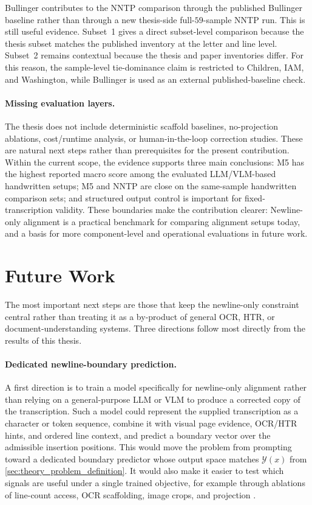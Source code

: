 Bullinger contributes to the NNTP comparison through the published Bullinger baseline rather than through a new thesis-side full-\(59\)-sample NNTP run. This is still useful evidence. Subset~1 gives a direct subset-level comparison because the thesis subset matches the published inventory at the letter and line level. Subset~2 remains contextual because the thesis and paper inventories differ. For this reason, the sample-level tie-dominance claim is restricted to Children, IAM, and Washington, while Bullinger is used as an external published-baseline check.

\paragraph{Missing evaluation layers.}
The thesis does not include deterministic scaffold baselines, no-projection ablations, cost/runtime analysis, or human-in-the-loop correction studies. These are natural next steps rather than prerequisites for the present contribution. Within the current scope, the evidence supports three main conclusions: M5 has the highest reported macro score among the evaluated LLM/VLM-based handwritten setups; M5 and NNTP are close on the same-sample handwritten comparison sets; and structured output control is important for fixed-transcription validity. These boundaries make the contribution clearer: Newline-only alignment is a practical benchmark for comparing alignment setups today, and a basis for more component-level and operational evaluations in future work.

\section{Future Work}
\label{sec:conclusion_future_work}

The most important next steps are those that keep the newline-only constraint central rather than treating it as a by-product of general OCR, HTR, or document-understanding systems. Three directions follow most directly from the results of this thesis.

\paragraph{Dedicated newline-boundary prediction.}
A first direction is to train a model specifically for newline-only alignment rather than relying on a general-purpose LLM or VLM to produce a corrected copy of the transcription. Such a model could represent the supplied transcription as a character or token sequence, combine it with visual page evidence, OCR/HTR hints, and ordered line context, and predict a boundary vector over the admissible insertion positions. This would move the problem from prompting toward a dedicated boundary predictor whose output space matches \(\mathcal{Y}(x)\) from \autoref{sec:theory_problem_definition}. It would also make it easier to test which signals are useful under a single trained objective, for example through ablations of line-count access, OCR scaffolding, image crops, and projection .

